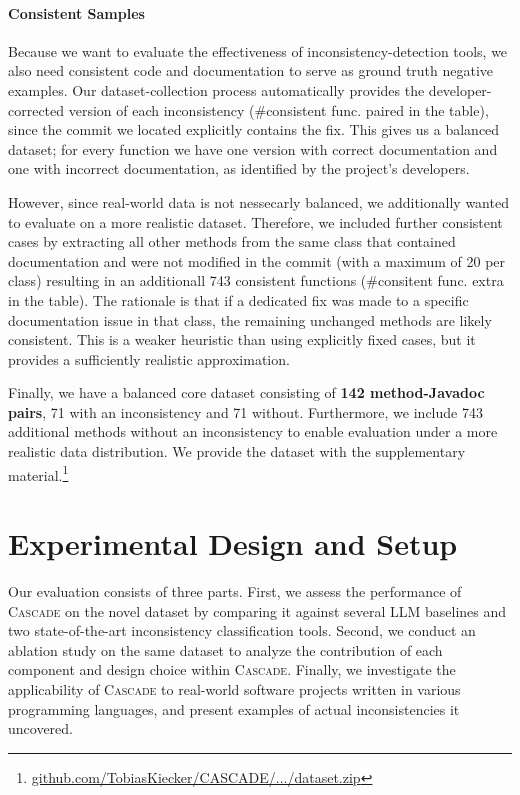\documentclass[acmsmall, screen]{acmart}
\newcommand{\tool}{\textsc{Cascade}\xspace}
\begin{document}
\paragraph{Consistent Samples} Because we want to evaluate the effectiveness of inconsistency-detection tools, we also need consistent code and documentation to serve as ground truth negative examples. Our dataset-collection process automatically provides the developer-corrected version of each inconsistency (\#consistent func. paired in the table), since the commit we located explicitly contains the fix. This gives us a balanced dataset; for every function we have one version with correct documentation and one with incorrect documentation, as identified by the project's developers.

However, since real-world data is not nessecarly balanced, we additionally wanted to evaluate on a more realistic dataset. Therefore, we included further consistent cases by extracting all other methods from the same class that contained documentation and were not modified in the commit (with a maximum of 20 per class) resulting in an additionall 743 consistent functions (\#consitent func. extra in the table). The rationale is that if a dedicated fix was made to a specific documentation issue in that class, the remaining unchanged methods are likely consistent. This is a weaker heuristic than using explicitly fixed cases, but it provides a sufficiently realistic approximation.

Finally, we have a balanced core dataset consisting of \textbf{142 method-Javadoc pairs}, 71 with an inconsistency and 71 without. Furthermore, we include 743 additional methods without an inconsistency to enable evaluation under a more realistic data distribution.
We provide the dataset with the supplementary material.\footnote{\href{https://github.com/TobiasKiecker/CASCADE/blob/FSE2026-v1.0.0/PaperEvaluation/dataset.zip}{github.com/TobiasKiecker/CASCADE/.../dataset.zip}}


\section{Experimental Design and Setup}\label{sec:eval}
Our evaluation consists of three parts. First, we assess the performance of \tool on the novel dataset by comparing it against several LLM baselines and two state-of-the-art inconsistency classification tools. 
Second, we conduct an ablation study on the same dataset to analyze the contribution of each component and design choice within \tool. 
Finally, we investigate the applicability of \tool to real-world software projects written in various programming languages, and present examples of actual inconsistencies it uncovered.
\end{document}
